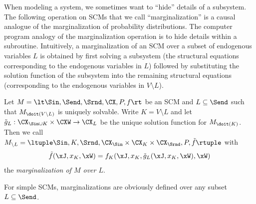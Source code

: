 When modeling a system, we sometimes want to ``hide'' details of a subsystem. The following operation
on SCMs that we call ``marginalization'' is a causal analogue of the marginalization of probability distributions.
The computer program analogy of the marginalization operation is to hide details within a subroutine.
Intuitively, a marginalization of an SCM over a subset of endogenous variables $L$ is obtained by first 
solving a subsystem (the structural equations
corresponding to the endogenous variables in $L$) followed by substituting the solution function of the 
subsystem into the remaining structural equations
(corresponding to the endogenous variables in $V\setminus L$).
\begin{Def}
  Let $M = \lt \Sin, \Send, \Srnd, \CX, P, f \rt$ be an SCM and $L \subseteq \Send$ such that
  $M_{\doit(V\setminus L)}$ is uniquely solvable.
  Write $K = V \setminus L$ and let $\tilde{g}_L : \CX_{\Sin \cup K} \times \CXW \to \CX_L$
  be the unique solution function for $M_{\doit(K)}$.
  Then we call $M_{\setminus L} = \ltuple \Sin, K, \Srnd, \CX_{\Sin} \times \CX_{K} \times \CX_{\Srnd}, P, \tilde{f} \rtuple$ with
  $$\tilde{f}(\xJ,x_{K},\xW) = f_{K}(\xJ,x_{K},\tilde{g}_L(\xJ,x_{K},\xW),\xW)$$
  the \emph{marginalization of $M$ over $L$}.
\end{Def}
For simple SCMs, marginalizations are obviously defined over any subset $L \subseteq \Send$.

